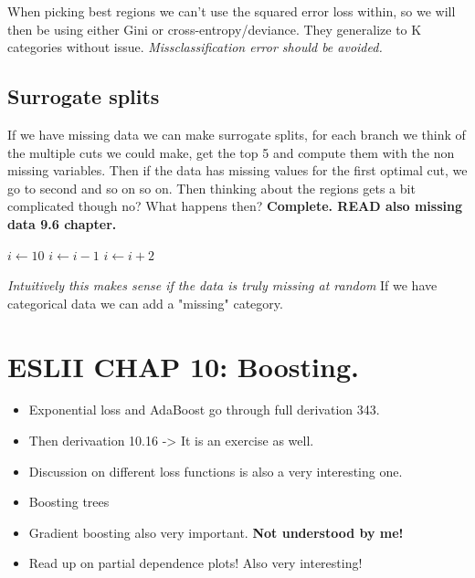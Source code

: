 \documentclass{article}
\begin{document}
When picking best regions we can't use the squared error loss within, so we will then be using either Gini or cross-entropy/deviance. They generalize to K categories without issue. \textit{ Missclassification error should be avoided.}  

\subsection*{Surrogate splits}
If we have missing data we can make surrogate splits, for each branch we think of the multiple cuts we could make, get the top 5 and compute them with the non missing variables.
Then if the data has missing values for the first optimal cut, we go to second and so on so on. Then thinking about the regions gets a bit complicated though no? 
What happens then? \textbf{Complete. READ also missing data 9.6 chapter.}

\begin{algorithmic}
\State $i \gets 10$
    \State $i \gets i-1$
\Else
        \State $i \gets i+2$
    \EndIf
\EndIf 
\end{algorithmic}


\textit{Intuitively this makes sense if the data is truly missing at random}
If we have categorical data we can add a "missing" category.

\section*{ESLII CHAP 10: Boosting.}
\begin{itemize}
    \item Exponential loss and AdaBoost go through full derivation 343.
    \item Then derivaation 10.16 -> It is an exercise as well.
    \item Discussion on different loss functions is also a very interesting one.
    \item Boosting trees 
    \item Gradient boosting also very important. \textbf{Not understood by me!}
    \item Read up on partial dependence plots! Also very interesting!
\end{itemize}
\end{document}
